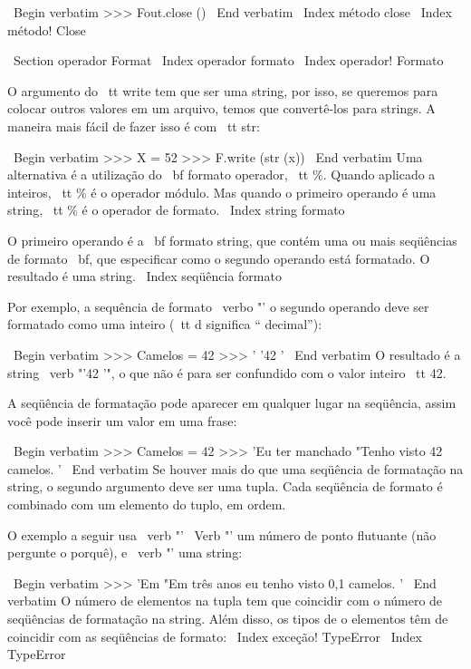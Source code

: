\documentclass[10pt]{book}
\begin{document}
\begin {itemize}
{{{{{{{{{{\ Begin {verbatim}
>>> Fout.close ()
\ End {verbatim}
%
\ Index {método close}
\ Index {método! Close}


\ Section {operador Format}
\ Index {operador formato}
\ Index {operador! Formato}

O argumento do {\ tt write} tem que ser uma string, por isso, se queremos
para colocar outros valores em um arquivo, temos que convertê-los para
strings. A maneira mais fácil de fazer isso é com {\ tt str}:

\ Begin {verbatim}
>>> X = 52
>>> F.write (str (x))
\ End {verbatim}
%
Uma alternativa é a utilização do {\ bf formato operador}, {\ tt \%}. Quando
aplicado a inteiros, {\ tt \%} é o operador módulo. Mas
quando o primeiro operando é uma string, {\ tt \%} é o operador de formato.
\ Index {string formato}

O primeiro operando é a {\ bf formato string}, que contém
uma ou mais seqüências de formato {\ bf}, que
especificar como
o segundo operando está formatado. O resultado é uma string.
\ Index {seqüência formato}

Por exemplo, a sequência de formato \ verbo "'%
o segundo operando deve ser formatado como uma
inteiro ({\ tt d} significa `` decimal''):

\ Begin {verbatim}
>>> Camelos = 42
>>> '%
'42 '
\ End {verbatim}
%
O resultado é a string \ verb "'42 '", o que não é para ser confundido
com o valor inteiro {\ tt 42}.

A seqüência de formatação pode aparecer em qualquer lugar na seqüência,
assim você pode inserir um valor em uma frase:

\ Begin {verbatim}
>>> Camelos = 42
>>> 'Eu ter manchado%
"Tenho visto 42 camelos. '
\ End {verbatim}
%
Se houver mais do que uma seqüência de formatação na string,
o segundo argumento deve ser uma tupla. Cada seqüência de formato é
combinado com um elemento do tuplo, em ordem.

O exemplo a seguir usa \ verb "'%
\ Verb "'%
um número de ponto flutuante (não pergunte o porquê), e \ verb "'%
uma string:

\ Begin {verbatim}
>>> 'Em%
"Em três anos eu tenho visto 0,1 camelos. '
\ End {verbatim}
%
O número de elementos na tupla tem que coincidir com o número
de seqüências de formatação na string. Além disso, os tipos de o
elementos têm de coincidir com as seqüências de formato:
\ Index {exceção! TypeError}
\ Index {} TypeError

}}}}}}}}}}
\end{itemize}
\end{document}
